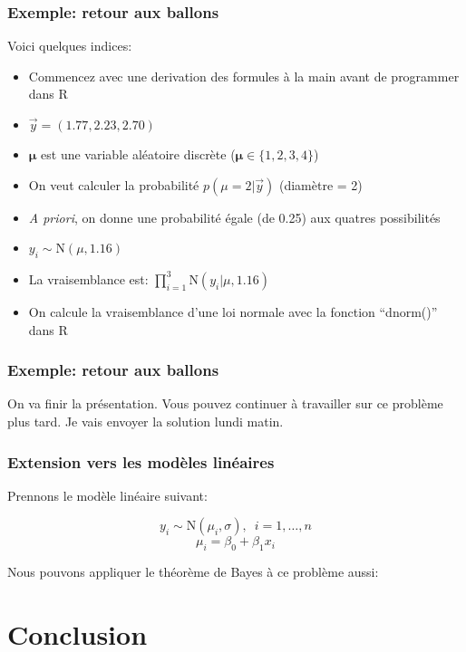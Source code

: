 \documentclass{beamer}
\begin{document}
\begin{frame}
    \frametitle{Exemple: retour aux ballons}
    Voici quelques indices:

    \vfill

    \begin{itemize}
      \item Commencez avec une derivation des formules à la main avant de programmer dans R
      \item $\vec{y} = (1.77, 2.23, 2.70)$
      \item $\boldsymbol{\mu}$ est une variable aléatoire discrète ($\boldsymbol{\mu} \in \{1, 2, 3, 4\}$)
      \item On veut calculer la probabilité $p(\mu = 2 | \vec{y})$ (diamètre = 2)
      \item \emph{A priori}, on donne une probabilité égale (de 0.25) aux quatres possibilités
      \pause
      \item $y_i \sim \textrm{N}(\mu, 1.16)$
      \pause
      \item La vraisemblance est: $\prod_{i=1}^{3} \textrm{N}(y_i | \mu, 1.16)$
      \pause
      \item On calcule la vraisemblance d'une loi normale avec la fonction ``dnorm()'' dans R
    \end{itemize}
\end{frame}


\begin{frame}
    \frametitle{Exemple: retour aux ballons}
    On va finir la présentation. Vous pouvez continuer à travailler sur ce problème plus tard.
    Je vais envoyer la solution lundi matin.
\end{frame}


\begin{frame}
    \frametitle{Extension vers les modèles linéaires}
    Prennons le modèle linéaire suivant:

    \[y_i \sim \textrm{N}(\mu_i, \sigma), \, \, \, i = 1, \ldots, n\]
    \[\mu_i = \beta_0 + \beta_1 x_i\]

    \pause

    Nous pouvons appliquer le théorème de Bayes à ce problème aussi:

    \pause

    
\end{frame}



\section{Conclusion}
\end{document}
